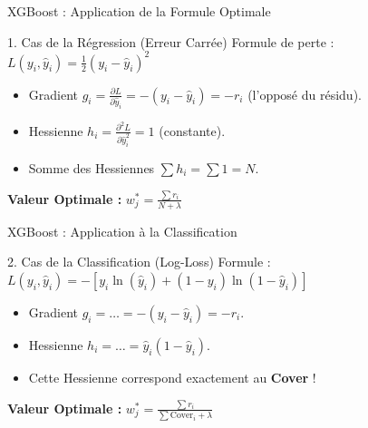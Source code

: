 \begin{frame}{XGBoost : Application de la Formule Optimale}
    \begin{block}{1. Cas de la Régression (Erreur Carrée)}
        \small
        Formule de perte : $\displaystyle L(y_i, \hat{y}_i) = \frac{1}{2}(y_i - \hat{y}_i)^2$
        \begin{itemize}
            \item Gradient $g_i = \frac{\partial L}{\partial \hat{y}_i} = -(y_i - \hat{y}_i) = -r_i$ (l'opposé du résidu).
            \item Hessienne $h_i = \frac{\partial^2 L}{\partial \hat{y}_i^2} = 1$ (constante).
            \item Somme des Hessiennes $\sum h_i = \sum 1 = N$.
        \end{itemize}
        \textbf{Valeur Optimale :} $\displaystyle w_j^* = \frac{\sum r_i}{N + \lambda}$
    \end{block}
    
    \vspace{0.1cm}

\end{frame}

\begin{frame}{XGBoost : Application à la Classification}
    \begin{block}{2. Cas de la Classification (Log-Loss)}
        \small
        Formule : $\displaystyle L(y_i, \hat{y}_i) = -[y_i \ln(\hat{y}_i) + (1-y_i) \ln(1-\hat{y}_i)]$
        \begin{itemize}
            \item Gradient $g_i = \dots = -(y_i - \hat{y}_i) = -r_i$.
            \item Hessienne $h_i = \dots = \hat{y}_i(1-\hat{y}_i)$. 
            \item Cette Hessienne correspond exactement au \textbf{Cover} !
        \end{itemize}
        \textbf{Valeur Optimale :} $\displaystyle w_j^* = \frac{\sum r_i}{\sum \text{Cover}_i + \lambda}$
    \end{block}
\end{frame}
